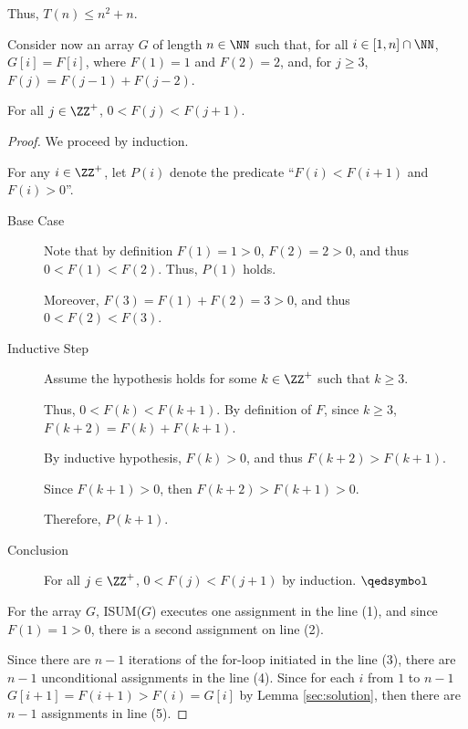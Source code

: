 \documentclass[11pt]{scrartcl}
\begin{document}
Thus, $T(n)\leq n^2+n$.

Consider now an array $G$ of length $n\in\NN$ such that, for all
$i\in[1, n]\cap\NN$, $G[i] = F[i]$, where $F(1) = 1$ and $F(2) = 2$,
and, for $j \geq 3$, $F(j) = F(j-1) + F(j-2)$.

\begin{lemma}
  \label{sec:solution}
For all $j\in\ZZ^+$, $0 < F(j) < F(j+1)$.
\end{lemma}

\begin{proof}
  \hfill

  We proceed by induction.

  For any $i\in \ZZ^+$, let $P(i)$ denote the predicate \enquote{$F(i) < F(i+1)$ and $F(i)> 0$}.

  \begin{description}
  \item[Base Case] \hfill

    Note that by definition $F(1) = 1 > 0$, $F(2) = 2 > 0$, and thus $0< F(1) < F(2)$. Thus, $P(1)$ holds.

    Moreover, $F(3) = F(1) + F(2) = 3 > 0$, and thus $0< F(2) < F(3)$.
  \item[Inductive Step] \hfill

    Assume the hypothesis holds for some $k\in \ZZ^{+}$ such that $k\geq 3$.

    Thus, $ 0 < F(k) < F(k+1)$. By definition of $F$, since $k\geq 3$,
    $F(k+2) = F(k) + F(k+1)$.

    By inductive hypothesis, $F(k) > 0$, and thus $F(k+2) > F(k+1)$.

    Since $F(k+1) > 0$, then $F(k+2) > F(k+1) > 0$.

    Therefore, $P(k+1)$.

  \item[Conclusion]
    \hfill

    For all $j\in\ZZ^+$, $0 <F(j) < F(j+1)$ by induction. $\qedsymbol$
  \end{description}

  For the array $G$, ISUM($G$) executes one assignment in the line (1), and since $F(1) = 1 > 0$, there is a second assignment on line (2).

  Since there are $n-1$ iterations of the for-loop initiated in the line (3), there are $n-1$ unconditional assignments in the line (4). Since for each $i$ from $1$ to $n-1$ $G[i+1] = F(i+1) > F(i) = G[i]$ by Lemma \ref{sec:solution}, then there are $n-1$ assignments in line (5).


\end{proof}
\end{document}
